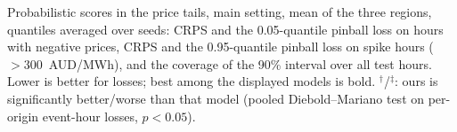 \providecommand{\materialsdir}{.}
\begin{table}[t]
  \centering
  \caption{Probabilistic scores in the price tails, main setting, mean of the
    three regions, quantiles averaged over seeds: CRPS and the 0.05-quantile
    pinball loss on hours with negative prices, CRPS and the 0.95-quantile
    pinball loss on spike hours ($>300$~AUD/MWh), and the coverage of the
    90\% interval over all test hours. Lower is better for losses; best among
    the displayed models is bold. $^{\dagger}$/$^{\ddagger}$:
    ours is significantly better/worse than that model (pooled
    Diebold--Mariano test on per-origin event-hour losses, $p<0.05$).}
  \label{tab:tails}
  \small
  
\end{table}
